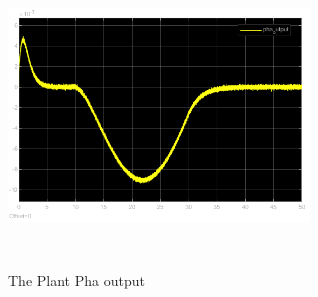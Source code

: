 \documentclass[12pt, a4paper]{article}
\begin{document}
\begin{enumerate}[1.]
\begin{figure}[H]
    \centering
    \includegraphics[width=8cm,height=8cm,scale=0.6]{pha_output.png}
    \caption{The Plant Pha output}
    \label{fig:label}
    \end{figure}
\begin{figure}[H]
        \centering
        \qquad

\end{figure}
\end{enumerate}
\end{document}

